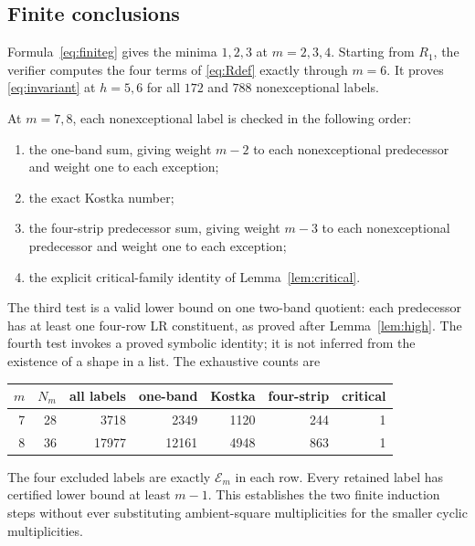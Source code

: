 \documentclass[11pt]{article}
\theoremstyle{remark}\newtheorem{remark}[theorem]{Remark}
\numberwithin{equation}{section}\setlength{\emergencystretch}{2em}
\begin{document}
\subsection{Finite conclusions}
Formula~\eqref{eq:finiteg} gives the minima $1,2,3$ at $m=2,3,4$.
Starting from $R_1$, the verifier computes the four terms of
\eqref{eq:Rdef} exactly through $m=6$. It proves \eqref{eq:invariant}
at $h=5,6$ for all $172$ and $788$ nonexceptional labels.

At $m=7,8$, each nonexceptional label is checked in the following order:
\begin{enumerate}
\item the one-band sum, giving weight $m-2$ to each nonexceptional
predecessor and weight one to each exception;
\item the exact Kostka number;
\item the four-strip predecessor sum, giving weight $m-3$ to each
nonexceptional predecessor and weight one to each exception;
\item the explicit critical-family identity of Lemma~\ref{lem:critical}.
\end{enumerate}
The third test is a valid lower bound on one two-band quotient: each
predecessor has at least one four-row LR constituent, as proved after
Lemma~\ref{lem:high}. The fourth test invokes a proved symbolic identity;
it is not inferred from the existence of a shape in a list.
The exhaustive counts are
\begin{center}
\begin{tabular}{rrrrrrr}\toprule
$m$&$N_m$&all labels&one-band&Kostka&four-strip&critical\\\midrule
7&28&3718&2349&1120&244&1\\
8&36&17977&12161&4948&863&1\\\bottomrule
\end{tabular}
\end{center}
The four excluded labels are exactly $\mathcal E_m$ in each row.
Every retained label has certified lower bound at least $m-1$.
This establishes the two finite induction steps without ever substituting
ambient-square multiplicities for the smaller cyclic multiplicities.
\end{document}
